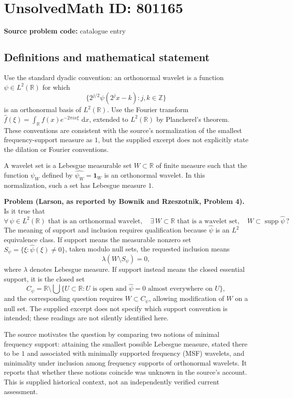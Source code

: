 \documentclass[11pt]{article}
\newcommand{\Z}{\mathbb{Z}}
\newcommand{\R}{\mathbb{R}}
\newcommand{\dd}{\,\mathrm{d}}
\begin{document}
\section*{UnsolvedMath ID: 801165}
\textbf{Source problem code:} catalogue entry
\subsection{Definitions and mathematical statement}
Use the standard dyadic convention: an orthonormal wavelet is a function \(\psi\in L^2(\R)\) for which
\[
\bigl\{2^{j/2}\psi(2^j x-k):j,k\in\Z\bigr\}
\]
is an orthonormal basis of \(L^2(\R)\). Use the Fourier transform \(\widehat f(\xi)=\int_{\R}f(x)e^{-2\pi i x\xi}\,\dd x\), extended to \(L^2(\R)\) by Plancherel's theorem. These conventions are consistent with the source's normalization of the smallest frequency-support measure as \(1\), but the supplied excerpt does not explicitly state the dilation or Fourier conventions.

A wavelet set is a Lebesgue measurable set \(W\subset\R\) of finite measure such that the function \(\psi_W\) defined by \(\widehat{\psi_W}=\mathbf 1_W\) is an orthonormal wavelet. In this normalization, such a set has Lebesgue measure \(1\).

\textbf{Problem (Larson, as reported by Bownik and Rzeszotnik, Problem 4).} Is it true that
\[
\forall\,\psi\in L^2(\R)\text{ that is an orthonormal wavelet},\quad
\exists\,W\subset\R\text{ that is a wavelet set},\quad
W\subset\operatorname{supp}\widehat\psi\,?
\]
The meaning of support and inclusion requires qualification because \(\widehat\psi\) is an \(L^2\) equivalence class. If support means the measurable nonzero set \(S_\psi=\{\xi:\widehat\psi(\xi)\ne0\}\), taken modulo null sets, the requested inclusion means
\[
\lambda(W\setminus S_\psi)=0,
\]
where \(\lambda\) denotes Lebesgue measure. If support instead means the closed essential support, it is the closed set
\[
C_\psi=\R\setminus\bigcup\{U\subset\R:U\text{ is open and }\widehat\psi=0\text{ almost everywhere on }U\},
\]
and the corresponding question requires \(W\subset C_\psi\), allowing modification of \(W\) on a null set. The supplied excerpt does not specify which support convention is intended; these readings are not silently identified here.

The source motivates the question by comparing two notions of minimal frequency support: attaining the smallest possible Lebesgue measure, stated there to be \(1\) and associated with minimally supported frequency (MSF) wavelets, and minimality under inclusion among frequency supports of orthonormal wavelets. It reports that whether these notions coincide was unknown in the source's account. This is supplied historical context, not an independently verified current assessment.
\end{document}
